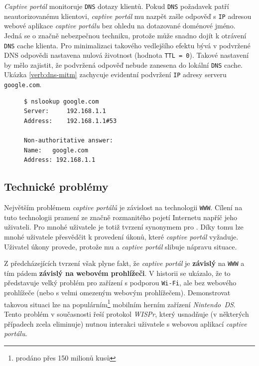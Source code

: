 \documentclass[thesis=M,czech]{FITthesis}[2012/10/20]
\renewcommand{\lstlistingname}{Ukázka kódu}
\begin{document}
\textit{Captive portál} monitoruje \texttt{DNS} dotazy klientů. Pokud \texttt{DNS} požadavek patří neautorizovanému klientovi, \textit{captive portál} mu nazpět zašle odpověď s \texttt{IP} adresou webové aplikace \textit{captive portálu} bez ohledu na dotazované doménové jméno. Jedná se o značně nebezpečnou techniku, protože může snadno dojít k otrávení \texttt{DNS} cache klienta. Pro minimalizaci takového vedlejšího efektu bývá v podvržené DNS odpovědi nastavena nulová životnost (hodnota \texttt{TTL = 0}). Takové nastavení by mělo zajistit, že podvržená odpověď nebude zanesena do lokální \texttt{DNS} cache. Ukázka \ref{verb:dns-mitm} zachycuje evidentní podvržení \texttt{IP} adresy serveru \texttt{google.com}.

\begin{figure}[h]
  \renewcommand{\lstlistingname}{Ukázka}
  \begin{lstlisting}[label=verb:dns-mitm, caption={Ukázka podvržení DNS odpovědi},frame=single]
$ nslookup google.com
Server:		192.168.1.1
Address:	192.168.1.1#53

Non-authoritative answer:
Name:	google.com
Address: 192.168.1.1
  \end{lstlisting}
\end{figure}


\subsection{Technické problémy}

Největším problémem \textit{captive portálů} je závislost na technologii \texttt{WWW}. Cílení na tuto technologii pramení ze značně rozmanitého pojetí Internetu napříč jeho uživateli. Pro mnohé uživatele je totiž tvrzení  synonymem pro . Díky tomu lze mnohé uživatele přesvědčit k provedení úkonů, které \textit{captive portál} vyžaduje. Uživatel úkony provede, protože mu  a \textit{captive portál} slibuje nápravu situace.

Z předcházejících tvrzení však plyne fakt, že \textit{captive portál} je \textbf{závislý} na \texttt{WWW} a tím pádem \textbf{závislý na webovém prohlížeči}. V historii se ukázalo, že to představuje velký problém pro zařízení s podporou \texttt{Wi-Fi}, ale bez webového prohlížeče (nebo s velmi omezeným webovým prohlížečem). Demonstrovat takovou situaci lze na populárním\footnote{prodáno přes 150 milionů kusů\cite{nintendo-sales}} mobilním herním zařízení \textit{Nintendo~DS}. Tento problém v současnosti řeší protokol \textit{WISPr}\cite{wispr-specs}, který usnadňuje (v některých případech zcela eliminuje) nutnou interakci uživatele s webovou aplikací \textit{captive portálu}.
\end{document}
